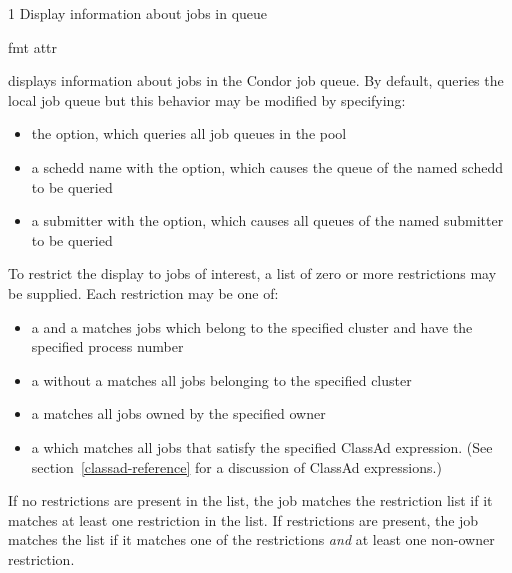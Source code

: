 \begin{ManPage}{\label{man-condor-q}}{1}
{Display information about jobs in queue}
\Synopsis {}

\ToolDebugOption
{} 
 {fmt attr}


\Description
{} displays information about jobs in the Condor job queue.  By
default,  queries the local job queue but this behavior may be 
modified by specifying:
\begin{itemize}
	\item the  option, which queries all job queues in the pool
	\item a schedd name with the  option, which causes the queue of 
		the named schedd to be queried 
	\item a submitter with the  option, which causes all queues
		of the named submitter to be queried
\end{itemize}

To restrict the display to jobs of interest, a list of zero or more 
restrictions may be supplied.  Each restriction may be one of:
\begin{itemize}
	\item a  and a  matches jobs which
		belong to the specified cluster and have the specified process number
	\item a  without a  matches all jobs belonging
		to the specified cluster
	\item a  matches all jobs owned by the specified owner
	\item a  which matches all jobs that
		satisfy the specified ClassAd expression. (See section~\ref{classad-reference}
		for a discussion of ClassAd expressions.)
\end{itemize}
If no  restrictions are present in the list, the job matches the 
restriction list if it matches at least one restriction in the list.  If 
 restrictions are present, the job matches the list if it matches 
one of the  restrictions \emph{and} at least one non-owner 
restriction.


\end{ManPage}
